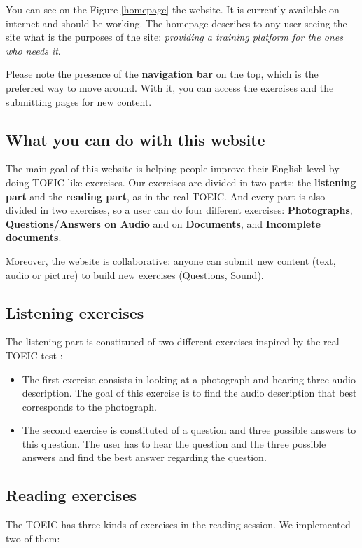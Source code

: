 \documentclass[12pt,a4paper]{report}
\begin{document}
You can see on the Figure \ref{homepage} the website. It is currently available on
internet and should be working. The homepage describes to any user seeing the site what is the purposes of the site: \textit{providing a training platform for the ones who needs it}.

Please note the presence of the \textbf{navigation bar} on the top, which is the preferred way to move around. With it, you can access the exercises and the submitting pages for new content.


\subsection{What you can do with this website}

The main goal of this website is helping people improve their
English level by doing TOEIC-like exercises. Our exercises are
divided in two parts: the \textbf{listening part} and the
\textbf{reading part}, as in the real TOEIC. And every part
is also divided in two exercises, so a user can do four different
exercises: \textbf{Photographs}, \textbf{Questions/Answers on Audio} and
on \textbf{Documents}, and \textbf{Incomplete documents}.

Moreover, the website is collaborative: anyone can submit new content (text, audio or picture) to build new exercises (Questions, Sound).

\subsection{Listening exercises}

The listening part is constituted of two different exercises inspired by the real TOEIC test :

\begin{itemize}
\item The first exercise consists in looking at a photograph and hearing three audio description. The goal of this exercise is to find the audio description that best corresponds to the photograph.

\item The second exercise is constituted of a question and three possible answers to this question. The user has to hear the question and the three possible answers and find the best answer regarding the question.
\end{itemize}

\subsection{Reading exercises}
The TOEIC has three kinds of exercises in the reading session. We implemented
two of them:
\end{document}
